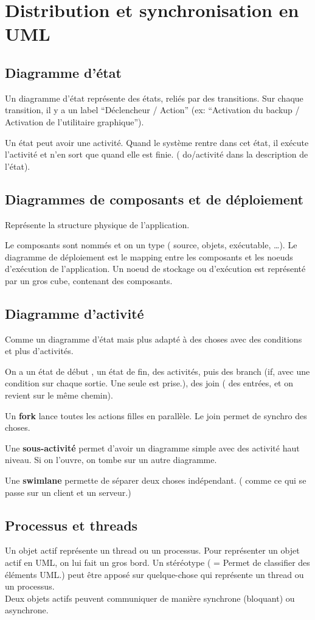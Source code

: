 \section{Distribution et synchronisation en UML}

\subsection{Diagramme d’état}
Un diagramme d’état représente des états, reliés par des transitions.
Sur chaque transition, il y a un label “Déclencheur / Action”
(ex: “Activation du backup / Activation de l’utilitaire graphique”).

Un état peut avoir une activité. Quand le système rentre dans cet état, il exécute l’activité et n’en sort que quand elle est finie. ( do/activité dans la description de l’état).

\subsection{Diagrammes de composants et de déploiement}
Représente la structure physique de l’application.

Le composants sont nommés et on un type ( source, objets, exécutable, …).
Le diagramme de déploiement est le mapping entre les composants et les noeuds d’exécution de l’application.
Un noeud de stockage ou d’exécution est représenté par un gros cube, contenant des composants.

\subsection{Diagramme d’activité}
Comme un diagramme d’état mais plus adapté à des choses avec des conditions et plus d’activités.

On a un état de début , un état de fin, des activités, puis des branch (if, avec une condition sur chaque sortie. Une seule est prise.), des join ( des entrées, et on revient sur le même chemin).

Un \textbf{fork} lance toutes les actions filles en parallèle. Le join permet de synchro des choses.

Une \textbf{sous-activité} permet d’avoir un diagramme simple avec des activité haut niveau. Si on l’ouvre, on tombe sur un autre diagramme.

Une \textbf{swimlane} permette de séparer deux choses indépendant. ( comme ce qui se passe sur un client et un serveur.)

\subsection{Processus et threads}
Un objet actif représente un thread ou un processus. 
Pour représenter un objet actif en UML, on lui fait un gros bord.
Un stéréotype ( = Permet de classifier des éléments UML.) peut être apposé sur quelque-chose qui représente un thread ou un processus.
\\Deux objets actifs peuvent communiquer de manière synchrone (bloquant) ou asynchrone.


